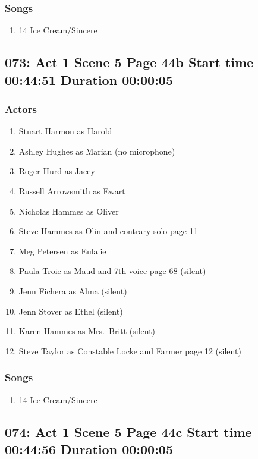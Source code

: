 \subsubsection{Songs}
\begin{enumerate}
\item 14 Ice Cream/Sincere
\end{enumerate}
\subsection{073: Act 1 Scene 5 Page 44b Start time 00:44:51 Duration 00:00:05}

\subsubsection{Actors}
\begin{enumerate}
\item Stuart Harmon as Harold
\item Ashley Hughes as Marian (no microphone)
\item Roger Hurd as Jacey
\item Russell Arrowsmith as Ewart
\item Nicholas Hammes as Oliver
\item Steve Hammes as Olin and contrary solo page 11
\item Meg Petersen as Eulalie
\item Paula Troie as Maud and 7th voice page 68 (silent)
\item Jenn Fichera as Alma (silent)
\item Jenn Stover as Ethel (silent)
\item Karen Hammes as Mrs.~Britt (silent)
\item Steve Taylor as Constable Locke and Farmer page 12 (silent)
\end{enumerate}

\subsubsection{Songs}
\begin{enumerate}
\item 14 Ice Cream/Sincere
\end{enumerate}
\subsection{074: Act 1 Scene 5 Page 44c Start time 00:44:56 Duration 00:00:05}

